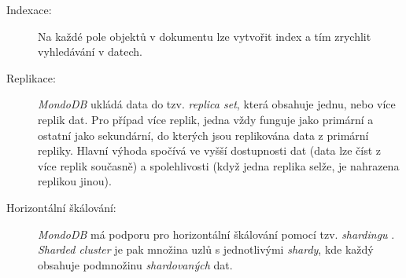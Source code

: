 \begin{description}
    \begin{description}
        \item[Indexace:] Na každé pole objektů v dokumentu lze vytvořit index a tím zrychlit vyhledávání v datech.
        \item[Replikace:] \textit{MondoDB} ukládá data do tzv. \textit{replica set}, která obsahuje jednu, nebo více replik dat. Pro případ více replik, jedna vždy funguje jako primární a ostatní jako sekundární, do kterých jsou replikována data z primární repliky. Hlavní výhoda spočívá ve vyšší dostupnosti dat (data lze číst z více replik současně) a spolehlivosti (když jedna replika selže, je nahrazena replikou jinou).
        \item[Horizontální škálování:] \textit{MondoDB} má podporu pro horizontální škálování pomocí tzv. \textit{shardingu} \cite{mongodb-scale}. \textit{Sharded cluster} je pak množina uzlů s jednotlivými \textit{shardy}, kde každý obsahuje podmnožinu \textit{shardovaných} dat.
    \end{description}

\end{description}